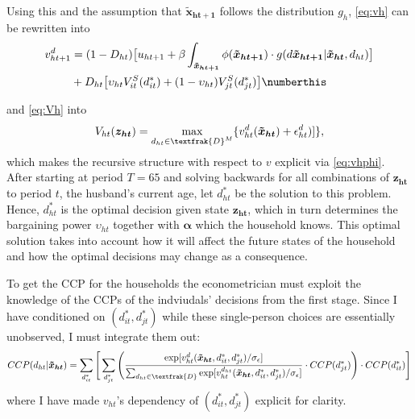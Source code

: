 Using this and the assumption that $\boldsymbol{\tilde{x}_{ht+1}}$ follows the distribution $g_h$, \eqref{eq:vh} can be rewritten into
\begin{align*}
v_{ht+1}^d&=(1-D_{ht})\big[u_{ht+1} +\beta \int_{\boldsymbol{\tilde{x}_{ht+1}}}{\phi(\boldsymbol{\tilde{x}_{ht+1}})\cdot g(d\boldsymbol{\tilde{x}_{ht+1}}|\boldsymbol{\tilde{x}_{ht}},d_{ht})}\big] \\
&+D_{ht}\big[\upsilon_{ht} V_{it}^S(d_{it}^*)+(1-\upsilon_{ht})V_{jt}^S(d_{jt}^*)\big] \numberthis
\label{eq:vhphi}
\end{align*}

and \eqref{eq:Vh} into
\begin{align}
V_{ht}(\boldsymbol{z_{ht}})=\max_{d_{ht}\in \textfrak{D}^M} \{v_{ht}^d(\boldsymbol{\tilde{x}_{ht}})+\epsilon_{ht}^d)]\},
\label{eq:Vhphi}
\end{align}
which makes the recursive structure with respect to $v$ explicit via \eqref{eq:vhphi}. After starting at period $T=65$ and solving backwards for all combinations of $\boldsymbol{z_{ht}}$ to period $t$, the husband's current age, let $d_{ht}^*$ be the solution to this problem. Hence, $d_{ht}^*$ is the optimal decision given state $\boldsymbol{z_{ht}}$, which in turn determines the bargaining power $\upsilon_{ht}$ together with $\boldsymbol{\alpha}$ which the household knows. This optimal solution takes into account how it will affect the future states of the household and how the optimal decisions may change as a consequence. 

To get the CCP for the households the econometrician must exploit the knowledge of the CCPs of the indviudals' decisions from the first stage. Since I have conditioned on $(d_{it}^*,d_{jt}^*)$ while these single-person choices are essentially unobserved, I must integrate them out: 
\begin{align*}
CCP(d_{ht}|\boldsymbol{\tilde{x}_{ht}})=\sum_{d_{it}^*}{\Bigg[\sum_{d_{jt}^*}{\Bigg(\frac{\exp[v_{ht}^{d}(\boldsymbol{\tilde{x}_{ht}},d_{it}^*,d_{jt}^*)/ \sigma_{\epsilon}]}{\sum_{d_{ht} \in \textfrak{D}} { \exp[v_{ht}^{d_{ht}}(\boldsymbol{\tilde{x}_{ht}},d_{it}^*,d_{jt}^*)/ \sigma_{\epsilon}]  }} \cdot CCP(d_{jt}^*)\Bigg)  }\cdot CCP(d_{it}^*)\Bigg]}
\end{align*}
where I have made $v_{ht}$'s dependency of $(d_{it}^*,d_{jt}^*)$ explicit for clarity.

